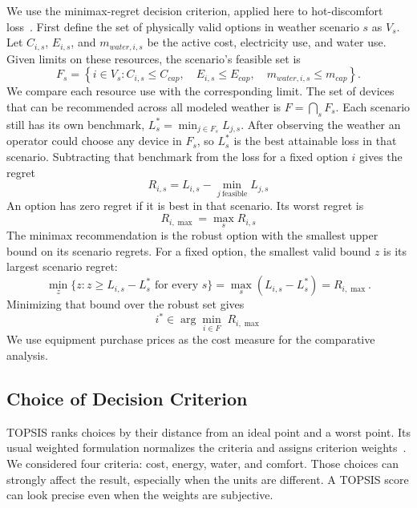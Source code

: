 We use the minimax-regret decision criterion, applied here to hot-discomfort loss~\cite{savage1951}. First define the set of physically valid options in weather scenario $s$ as $V_s$. Let $C_{i,s}$, $E_{i,s}$, and $m_{water,i,s}$ be the active cost, electricity use, and water use. Given limits on these resources, the scenario's feasible set is
\begin{equation}
 F_s=\left\{i\in V_s:
   C_{i,s}\le C_{cap},\quad
   E_{i,s}\le E_{cap},\quad
   m_{water,i,s}\le m_{cap}\right\}.
\end{equation}
We compare each resource use with the corresponding limit. The set of devices that can be recommended across all modeled weather is $F=\bigcap_s F_s$. Each scenario still has its own benchmark, $L_s^*=\min_{j\in F_s}L_{j,s}$. After observing the weather an operator could choose any device in $F_s$, so $L_s^*$ is the best attainable loss in that scenario. Subtracting that benchmark from the loss for a fixed option $i$ gives the regret
\begin{equation}
R_{i,s} = L_{i,s} - \min_{j\ \text{feasible}} L_{j,s}
\end{equation}
An option has zero regret if it is best in that scenario. Its worst regret is
\begin{equation}
R_{i,\max} = \max_{s} R_{i,s}
\end{equation}
The minimax recommendation is the robust option with the smallest upper bound on its scenario regrets. For a fixed option, the smallest valid bound $z$ is its largest scenario regret:
\begin{equation}
 \min_z\{z: z\ge L_{i,s}-L_s^* \text{ for every }s\}
 = \max_s(L_{i,s}-L_s^*)=R_{i,\max}.
\end{equation}
Minimizing that bound over the robust set gives
\begin{equation}
i^{*} \in \arg\min_{i\in F}\; R_{i,\max}
\end{equation}
We use equipment purchase prices as the cost measure for the comparative analysis.
 
\subsection{Choice of Decision Criterion}
 
TOPSIS ranks choices by their distance from an ideal point and a worst point. Its usual weighted formulation normalizes the criteria and assigns criterion weights~\cite{hwang_yoon1981}. We considered four criteria: cost, energy, water, and comfort. Those choices can strongly affect the result, especially when the units are different. A TOPSIS score can look precise even when the weights are subjective.
 
